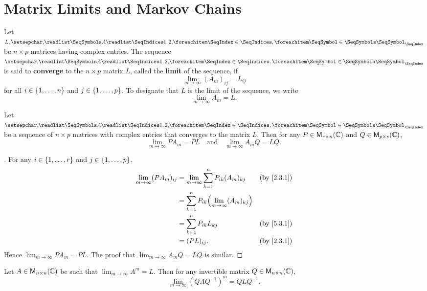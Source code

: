 \section{Matrix Limits and Markov Chains}\label{sec:5.3}

\begin{defn}\label{5.3.1}
	Let \(L, \seq{A}{1,2,}\) be \(n \times p\) matrices having complex entries.
	The sequence \(\seq{A}{1,2,}\) is said to \textbf{converge} to the \(n \times p\) matrix \(L\), called the \textbf{limit} of the sequence, if
	\[
		\lim_{m \to \infty} (A_m)_{i j} = L_{i j}
	\]
	for all \(i \in \left\lbrace1, \dots, n\right\rbrace\) and \(j \in \left\lbrace1, \dots, p\right\rbrace\).
	To designate that \(L\) is the limit of the sequence, we write
	\[
		\lim_{m \to \infty} A_m = L.
	\]
\end{defn}

\begin{thm}\label{5.12}
	Let \(\seq{A}{1,2,}\) be a sequence of \(n \times p\) matrices with complex entries that converges to the matrix \(L\).
	Then for any \(P \in \ms[r][n][\C]\) and \(Q \in \ms[p][s][\C]\),
	\[
		\lim_{m \to \infty} P A_m = PL \quad \text{and} \quad \lim_{m \to \infty} A_m Q = LQ.
	\]
\end{thm}

\begin{proof}[]
	For any \(i \in \left\lbrace1, \dots, r\right\rbrace\) and \(j \in \left\lbrace1, \dots, p\right\rbrace\),
	\begin{align*}
		\lim_{m \to \infty} (P A_m)_{i j} & = \lim_{m \to \infty} \sum_{k = 1}^n P_{i k} (A_m)_{k j}      &  & \by{2.3.1} \\
		                                  & = \sum_{k = 1}^n P_{i k} \pa{\lim_{m \to \infty} (A_m)_{k j}}                 \\
		                                  & = \sum_{k = 1}^n P_{i k} L_{k j}                              &  & \by{5.3.1} \\
		                                  & = (PL)_{i j}.                                                 &  & \by{2.3.1}
	\end{align*}
	Hence \(\lim_{m \to \infty} P A_m = PL\).
	The proof that \(\lim_{m \to \infty} A_m Q = LQ\) is similar.
\end{proof}

\begin{cor}\label{5.3.2}
	Let \(A \in \ms[n][n][\C]\) be such that \(\lim_{m \to \infty} A^m = L\).
	Then for any invertible matrix \(Q \in \ms[n][n][\C]\),
	\[
		\lim_{m \to \infty} (Q A Q^{-1})^m = Q L Q^{-1}.
	\]
\end{cor}


